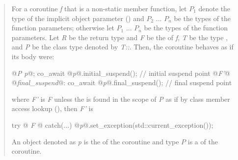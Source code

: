 \begin{quote}
\pnum
For a coroutine \textit{f} that is a non-static member function, let $P_1$ denote the type of the implicit object parameter () and $P_2$ ... $P_n$ be the types of the function parameters; otherwise let $P_1$ ... $P_n$ be the types of the function parameters.
Let \textit{R} be the return type and \textit{F} be the 
of \textit{f}, \textit{T} be the type , and \textit{P} be the class type denoted by \textit{T::}. 
Then, the coroutine behaves as if its body were:
\begin{codeblock}
  {
     @\textit{P p}@;
     co_await @\textit{p}@.initial_suspend(); // initial suspend point
     @\textit{F'}@
  @\textit{final_suspend}@:
     co_await @\textit{p}@.final_suspend(); // final suspend point
  }
\end{codeblock}
where %
\textit{F'} is \textit{F} 
unless the   is found in the scope of \textit{P}
as if by class member access lookup (), then \textit{F'} is


\begin{codeblock}
  try {@\textit{ F }@} catch(...) { @\textit{p}@.set_exception(std::current_exception()); }
\end{codeblock}

An object denoted as \textit{p} is the  of
the coroutine and type $P$ is a 
of the coroutine.



\end{quote}
